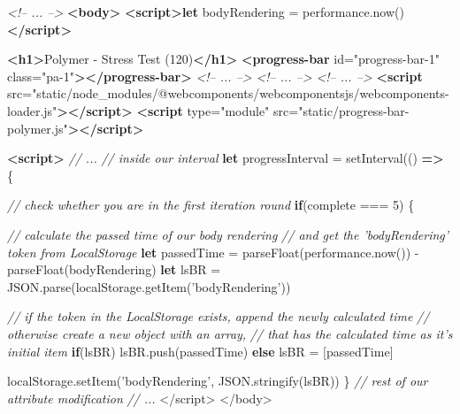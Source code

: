 \documentclass[11pt]{article}
\newenvironment{Shaded}{}{}
\newcommand{\KeywordTok}[1]{\textcolor[rgb]{0.00,0.44,0.13}{\textbf{{#1}}}}
\newcommand{\DecValTok}[1]{\textcolor[rgb]{0.25,0.63,0.44}{{#1}}}
\newcommand{\StringTok}[1]{\textcolor[rgb]{0.25,0.44,0.63}{{#1}}}
\newcommand{\CommentTok}[1]{\textcolor[rgb]{0.38,0.63,0.69}{\textit{{#1}}}}
\newcommand{\OtherTok}[1]{\textcolor[rgb]{0.00,0.44,0.13}{{#1}}}
\newcommand{\NormalTok}[1]{{#1}}
\newcommand{\VariableTok}[1]{\textcolor[rgb]{0.10,0.09,0.49}{{#1}}}
\newcommand{\ControlFlowTok}[1]{\textcolor[rgb]{0.00,0.44,0.13}{\textbf{{#1}}}}
\newcommand{\OperatorTok}[1]{\textcolor[rgb]{0.40,0.40,0.40}{{#1}}}
\newcommand{\AttributeTok}[1]{\textcolor[rgb]{0.49,0.56,0.16}{{#1}}}
\begin{document}
    \begin{Shaded}
\begin{Highlighting}[]
\CommentTok{<!-- ... -->}
\KeywordTok{<body>}
    \KeywordTok{<script>let}\NormalTok{ bodyRendering }\OperatorTok{=} \VariableTok{performance}\NormalTok{.}\AttributeTok{now}\NormalTok{()}\KeywordTok{</script>}

    \KeywordTok{<h1>}\NormalTok{Polymer - Stress Test (120)}\KeywordTok{</h1>}
    \KeywordTok{<progress-bar}\OtherTok{ id=}\StringTok{"progress-bar-1"}\OtherTok{ class=}\StringTok{"pa-1"}\KeywordTok{></progress-bar>}
    \CommentTok{<!-- ... -->}
    \CommentTok{<!-- ... -->}
    \CommentTok{<!-- ... -->}
    \KeywordTok{<script}\OtherTok{ src=}\StringTok{"static/node_modules/@webcomponents/webcomponentsjs/webcomponents-loader.js"}\KeywordTok{></script>}
    \KeywordTok{<script}\OtherTok{ type=}\StringTok{"module"}\OtherTok{ src=}\StringTok{"static/progress-bar-polymer.js"}\KeywordTok{></script>}

    \KeywordTok{<script>}
    \CommentTok{// ...}
    \CommentTok{// inside our interval}
        \KeywordTok{let}\NormalTok{ progressInterval }\OperatorTok{=} \AttributeTok{setInterval}\NormalTok{(() }\KeywordTok{=>} \OperatorTok{\{}
        
        \CommentTok{// check whether you are in the first iteration round}
            \ControlFlowTok{if}\NormalTok{(complete }\OperatorTok{===} \DecValTok{5}\NormalTok{) }\OperatorTok{\{}
        
                \CommentTok{// calculate the passed time of our body rendering }
                \CommentTok{// and get the 'bodyRendering' token from LocalStorage}
                \KeywordTok{let}\NormalTok{ passedTime }\OperatorTok{=} \AttributeTok{parseFloat}\NormalTok{(}\VariableTok{performance}\NormalTok{.}\AttributeTok{now}\NormalTok{()) }\OperatorTok{-} \AttributeTok{parseFloat}\NormalTok{(bodyRendering)}
                \KeywordTok{let}\NormalTok{ lsBR }\OperatorTok{=} \VariableTok{JSON}\NormalTok{.}\AttributeTok{parse}\NormalTok{(}\VariableTok{localStorage}\NormalTok{.}\AttributeTok{getItem}\NormalTok{(}\StringTok{'bodyRendering'}\NormalTok{))}
        
                \CommentTok{// if the token in the LocalStorage exists, append the newly calculated time}
                \CommentTok{// otherwise create a new object with an array, }
                \CommentTok{// that has the calculated time as it's initial item}
                \ControlFlowTok{if}\NormalTok{(lsBR)}
                    \VariableTok{lsBR}\NormalTok{.}\AttributeTok{push}\NormalTok{(passedTime)}
                \ControlFlowTok{else}
\NormalTok{                    lsBR }\OperatorTok{=}\NormalTok{ [passedTime]}

                \VariableTok{localStorage}\NormalTok{.}\AttributeTok{setItem}\NormalTok{(}\StringTok{'bodyRendering'}\OperatorTok{,} \VariableTok{JSON}\NormalTok{.}\AttributeTok{stringify}\NormalTok{(lsBR))}
            \OperatorTok{\}}
    \CommentTok{// rest of our attribute modification}
    \CommentTok{// ...}
\NormalTok{    </script}\OperatorTok{>}
\NormalTok{</body}\OperatorTok{>}
\end{Highlighting}
\end{Shaded}
\end{document}
